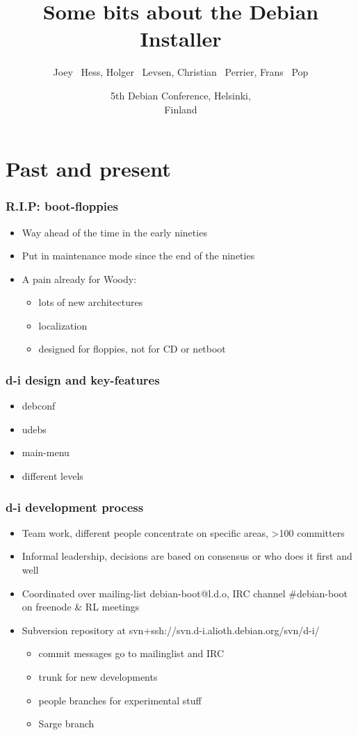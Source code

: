 \documentclass{beamer}
\title[Some bits about the Debian Installer] %
{Some bits about the Debian Installer}
\author[joeyh, h0lger, bubulle, fjp] %
{Joey ~Hess, Holger ~Levsen, Christian ~Perrier, Frans ~Pop}
\date[Debconf 5] %
{5th Debian Conference, Helsinki,\\ Finland}
\begin{document}
\begin{frame}
  \titlepage
\end{frame}


\section{Past and present}

\begin{frame}
  \frametitle{R.I.P: boot-floppies}
	\begin{itemize}
	\item
	 	Way ahead of the time in the early nineties
	\item
		Put in maintenance mode since the end of the nineties
	\item
		A pain already for Woody: 
		\begin{itemize}
			\item
				lots of new architectures
			\item
				localization 
			\item
				designed for floppies, not for CD or netboot
		\end{itemize}
	\end{itemize}
\end{frame}

\begin{frame}
  \frametitle{d-i design and key-features}
	\begin{itemize}
	\item
		debconf
	\item
		udebs
	\item
		main-menu	
	\item
		different levels
	\end{itemize}
\end{frame}

\begin{frame}
  \frametitle{d-i development process}
	\begin{itemize}
	\item
		Team work, different people concentrate on specific areas, >100 committers
	\item
		Informal leadership, decisions are based on consensus or who does it first and well
	\item
		Coordinated over mailing-list debian-boot@l.d.o, IRC channel \#debian-boot on freenode \& RL meetings 
	\item
		Subversion repository at svn+ssh://svn.d-i.alioth.debian.org/svn/d-i/
		\begin{itemize}
			\item
				commit messages go to mailinglist and IRC
			\item
				trunk for new developments
			\item
				people branches for experimental stuff
			\item
				Sarge branch
		\end{itemize}
	\end{itemize}
\end{frame}
\end{document}

